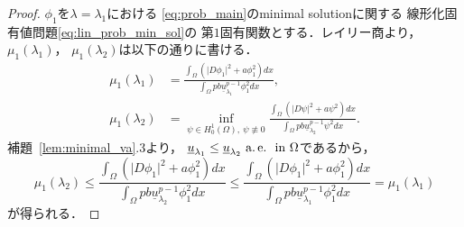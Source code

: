 \begin{proof}
 $\phi_1$を$\lambda = \lambda_1$における
 \ref{eq:prob_main}のminimal solutionに関する
 線形化固有値問題\eqref{eq:lin_prob_min_sol}の
 第$1$固有関数とする．レイリー商より，$\mu_1(\lambda_1)$，
 $\mu_1(\lambda_2)$は以下の通りに書ける．
 \begin{align*}
  \mu_1(\lambda_1) &= \frac{\displaystyle 
  \int_\Omega \left( \lvert D\phi_1 \rvert^2
  + a \phi_1^2 \right) dx}{\displaystyle \int_\Omega p b
  \underline{u}_{\lambda_1}^{p-1} \phi_1^2 dx}, \\
  \mu_1(\lambda_2) &= \inf_{\psi \in H_0^1(\Omega), \ \psi \not\equiv
  0} \frac{\displaystyle 
  \int_\Omega \left( \lvert D\psi \rvert^2
  + a \psi^2 \right) dx}{\displaystyle \int_\Omega p b
  \underline{u}_{\lambda_2}^{p-1} \psi^2 dx}.
 \end{align*}
 補題~\ref{lem:minimal_va}.3より，
 $\underline{u}_{\lambda_1} \leq \underline{u}_{\lambda_2} ~\text{a.\,e.}~ ~\text{in}~
 \Omega$であるから，
 \[
  \mu_1(\lambda_2) \leq 
  \frac{\displaystyle 
  \int_\Omega \left( \lvert D\phi_1 \rvert^2
  + a \phi_1^2 \right) dx}{\displaystyle \int_\Omega p b
  \underline{u}_{\lambda_2}^{p-1} \phi_1^2 dx} \leq
  \frac{\displaystyle 
  \int_\Omega \left( \lvert D\phi_1 \rvert^2
  + a \phi_1^2 \right) dx}{\displaystyle \int_\Omega p b
  \underline{u}_{\lambda_1}^{p-1} \phi_1^2 dx} = \mu_1(\lambda_1)
 \]
 が得られる． \qedhere
\end{proof}

